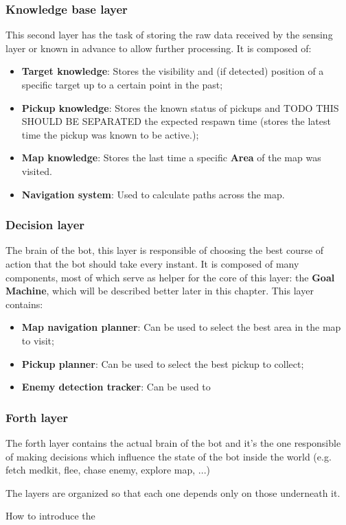 \subsubsection{Knowledge base layer}
This second layer has the task of storing the raw data received by the sensing layer or known in advance to allow further processing.
It is composed of:
\begin{itemize}
    \item \textbf{Target knowledge}: Stores the visibility and (if detected) position of a specific target up to a certain point in the past;
    \item \textbf{Pickup knowledge}: Stores the known status of pickups and TODO THIS SHOULD BE SEPARATED the expected respawn time (stores the latest time the pickup was known to be active.);
    \item \textbf{Map knowledge}: Stores the last time a specific \textbf{Area} of the map was visited.
    \item \textbf{Navigation system}: Used to calculate paths across the map.
\end{itemize}

\subsubsection{Decision layer}
The brain of the bot, this layer is responsible of choosing the best course of action that the bot should take every instant.
It is composed of many components, most of which serve as helper for the core of this layer: the \textbf{Goal Machine}, which will be described better later in this chapter.
This layer contains:
\begin{itemize}
    \item \textbf{Map navigation planner}: Can be used to select the best area in the map to visit;
    \item \textbf{Pickup planner}: Can be used to select the best pickup to collect;
    \item \textbf{Enemy detection tracker}: Can be used to 
\end{itemize}



\subsubsection{Forth layer}

The forth layer contains the actual brain of the bot and it's the one responsible of making decisions which influence the state of the bot inside the world (e.g. fetch medkit, flee, chase enemy, explore map, ...)

The layers are organized so that each one depends only on those underneath it.



How to introduce the 

